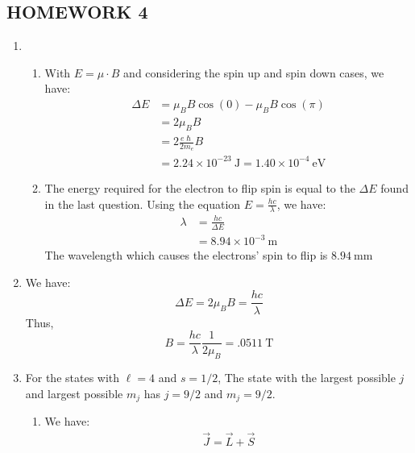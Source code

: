 \documentclass[10pt]{article}
\begin{document}

\begin{centering}
  \section*{HOMEWORK 4}
\end{centering}

\begin{enumerate}
\item 
  \begin{enumerate}
  \item 
    With $ E = \mu \cdot B $ and considering the spin up and spin down cases,
    we have:
    \begin{align*}
      \Delta E &= \mu_B B \cos(0) - \mu_B B \cos(\pi) \\
               &= 2 \mu_B B \\
               &= 2 \frac{e \hslash}{2m_e} B \\
               &= 2.24 \times 10^{-23}~\text{J} = 1.40 \times 10^{-4}~\text{eV}
    \end{align*}
  \item 
    The energy required for the electron to flip spin is equal to the $ \Delta E $ found in the last question.
    Using the equation $ E=\frac{hc}{\lambda} $, we have:
    \begin{align*}
      \lambda &= \frac{hc}{\Delta E} \\
              &= 8.94 \times 10^{-3}~\text{m}
    \end{align*}
    The wavelength which causes the electrons' spin to flip is $ 8.94~\text{mm} $
  \end{enumerate}
\item
  We have:
  \begin{equation*}
    \Delta E = 2 \mu_B B = \frac{hc}{\lambda}
  \end{equation*}
  Thus,
  \begin{equation*}
    B = \frac{hc}{\lambda} \frac{1}{2 \mu_B} = .0511~\text{T}
  \end{equation*}
\item 
  For the states with $ \ell=4 $ and $ s=1/2 $, The state with the largest possible $ j $ and largest possible $ m_j $ has $ j=9 / 2 $ and $ m_j = 9 / 2 $.
  \begin{enumerate}
  \item   
  We have:
  \begin{gather*}
    \vec{J} = \vec{L} + \vec{S} \\

\end{gather*}
\end{enumerate}
\end{enumerate}
\end{document}
